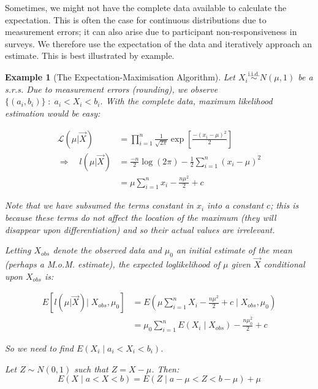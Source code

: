 \documentclass[12pt,a4paper]{article}
\newtheorem{ex}[thm]{Example}
\begin{document}
Sometimes, we might not have the complete data available to calculate the expectation. This is often the case for continuous distributions due to measurement errors; it can also arise due to participant non-responsiveness in surveys. We therefore use the expectation of the data and iteratively approach an estimate. This is best illustrated by example.

\begin{ex}[The Expectation-Maximisation Algorithm]\vspace{1cm}

Let $X_i \overset{\text{i.i.d.}}{\sim} N(\mu, 1)$ be a s.r.s. Due to measurement errors (rounding), we observe $\{(a_i,b_i)\}\; : \; a_i < X_i < b_i$. With the complete data, maximum likelihood estimation would be easy:

\begin{align*}
\mathcal{L}\left(\mu \big| \vec{X}\right) &= \prod_{i=1}^n \frac{1}{\sqrt{2\pi}} \exp\left[\frac{-(x_i-\mu)^2}{2}\right]\\
\Rightarrow\quad l\left(\mu \big| \vec{X}\right) &= \frac{-n}{2} \log(2\pi) - \frac{1}{2} \sum_{i=1}^n (x_i - \mu)^2\\
&= \mu \sum_{i=1}^n x_i - \frac{n \mu^2}{2} + c
\end{align*}

Note that we have subsumed the terms constant in $x_i$ into a constant $c$; this is because these terms do not affect the location of the maximum (they will disappear upon differentiation) and so their actual values are irrelevant.

Letting $X_{obs}$ denote the observed data and $\mu_0$ an initial estimate of the mean (perhaps a M.o.M. estimate), the expected loglikelihood of $\mu$ given $\vec{X}$ conditional upon $X_{obs}$ is:

\begin{align*}
E\left[l\left(\mu | \vec{X}\right) \bigg| \; X_{obs},\mu_0\right] &= E\left(\mu \sum_{i=1}^n X_i - \frac{n\mu^2}{2} + c\;\Bigg|\; X_{obs},\mu_0\right)\\
&= \mu_0 \sum_{i=1}^n E(X_i \mid X_{obs}) - \frac{n\mu_0^2}{2} + c
\end{align*}

So we need to find $E(X_i \mid a_i < X_i < b_i)$.

Let $Z \sim N(0,1)$ such that $Z=X-\mu$. Then:
$$E(X\mid a<X<b) = E(Z \mid a-\mu<Z<b-\mu) + \mu$$


\end{ex}
\end{document}
